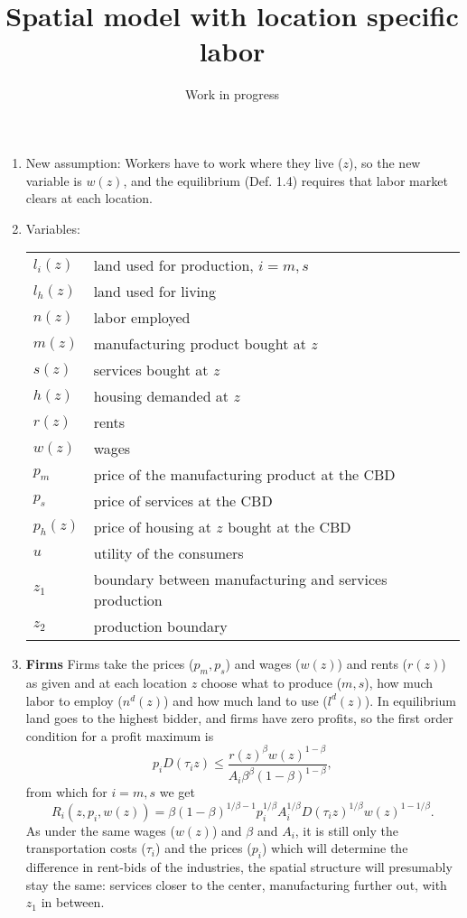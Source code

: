\documentclass[10pt]{article}
\begin{document}
\title{Spatial model with location specific labor}
\subtitle{Work in progress}
\maketitle

\begin{enumerate}
\item New assumption: Workers have to work where they live ($z$), so the new variable is $w(z)$, and the equilibrium (Def. 1.4) requires that labor market clears at each location.
\item Variables:
\begin{table}[h!] 
\center
\begin{tabular}{ll}
$l_i(z)$ & land used for production, $i=m,s$ \\
$l_h(z)$ & land used for living \\
$n(z)$ & labor employed\\
$m(z)$ & manufacturing product bought at $z$ \\
$s(z)$ & services bought at $z$ \\
$h(z)$ & housing demanded at $z$ \\
$r(z)$ & rents \\
$w(z)$ & wages \\
$p_m$ & price of the manufacturing product at the CBD \\
$p_s$ & price of services at the CBD \\
$p_h(z)$ & price of housing at $z$ bought at the CBD \\
$u$ & utility of the consumers\\
$z_1$ & boundary between manufacturing and services production \\
$z_2$ & production boundary \\
\end{tabular}
\end{table}

\item \textbf{Firms}
Firms take the prices ($p_m,p_s$) and wages ($w(z)$) and rents ($r(z)$) as given and at each location $z$ choose what to produce ($m,s$), how much labor to employ ($n^d(z)$) and how much land to use ($l^d(z)$). In equilibrium land goes to the highest bidder, and firms have zero profits, so the first order condition for a profit maximum is 
\begin{equation*}
p_iD(\tau_iz)\leq \frac{r(z)^\beta w(z)^{1-\beta}}{A_i\beta^\beta(1-\beta)^{1-\beta}},
\end{equation*}
from which for $i=m,s$ we get
\begin{equation}\label{eq:bidrent:industry}
R_i(z,p_i,w(z)) = \beta (1-\beta)^{1/\beta-1} p_i^{1/\beta} A_i^{1/\beta} D(\tau_i z)^{1/\beta}w(z)^{1-1/\beta}.
\end{equation}
As under the same wages ($w(z)$) and $\beta$ and $A_i$, it is still only the transportation costs ($\tau_i$) and the prices ($p_i$) which will determine the difference in rent-bids of the industries, the spatial structure will presumably stay the same: services closer to the center, manufacturing further out, with $z_1$ in between.


\end{enumerate}
\end{document}
